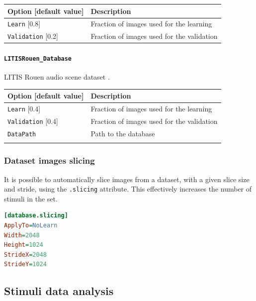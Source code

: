 \documentclass[a4paper,11pt,oneside]{article}
\begin{document}
\begin{center}
 \begin{tabular}{| p{5cm} | p{10cm} | }
 \hline
 Option [default value] & Description\\
 \hline\hline
  \cellcolor{requiredcolor}
  \lstinline!Learn! [0.8] & Fraction of images used for the learning \\
  \lstinline!Validation! [0.2] & Fraction of images used for the validation \\
 \hline
\end{tabular}
\end{center}

\paragraph{\texorpdfstring{%
\lstinline[basicstyle=\ttfamily\bfseries]!LITISRouen_Database!}
{LITISRouen\_Database}}
LITIS Rouen audio scene dataset \citep{Rakotomamonjy2014}.

\begin{center}
 \begin{tabular}{| p{5cm} | p{10cm} | }
 \hline
 Option [default value] & Description\\
 \hline\hline
  \lstinline!Learn! [0.4] & Fraction of images used for the learning \\
  \lstinline!Validation! [0.4] & Fraction of images used for the validation \\
  \lstinline!DataPath! & Path to the database \\
   & \\
 \hline
\end{tabular}
\end{center}

\subsubsection{Dataset images slicing}

It is possible to automatically slice images from a dataset, with a given slice
 size and stride, using the \lstinline!.slicing! attribute. This effectively
 increases the number of stimuli in the set.

\begin{lstlisting}[language=ini]
[database.slicing]
ApplyTo=NoLearn
Width=2048
Height=1024
StrideX=2048
StrideY=1024
\end{lstlisting}

\subsection{Stimuli data analysis}
\end{document}
